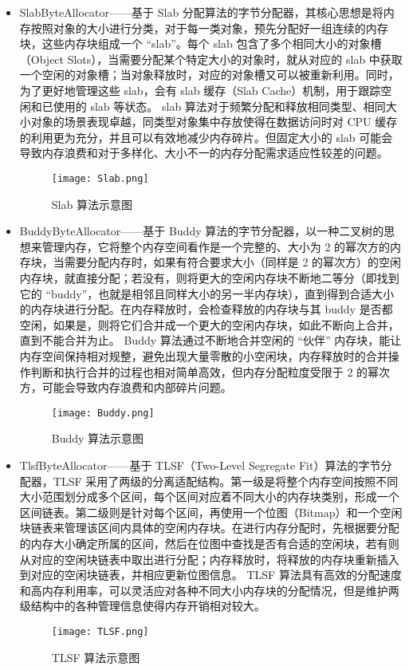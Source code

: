 \begin{itemize}
\item SlabByteAllocator——基于 Slab 分配算法的字节分配器，其核心思想是将内存按照对象的大小进行分类，对于每一类对象，预先分配好一组连续的内存块，这些内存块组成一个 “slab”。每个 slab 包含了多个相同大小的对象槽（Object Slots），当需要分配某个特定大小的对象时，就从对应的 slab 中获取一个空闲的对象槽；当对象释放时，对应的对象槽又可以被重新利用。同时，为了更好地管理这些 slab，会有 slab 缓存（Slab Cache）机制，用于跟踪空闲和已使用的 slab 等状态。
slab 算法对于频繁分配和释放相同类型、相同大小对象的场景表现卓越，同类型对象集中存放使得在数据访问时对 CPU 缓存的利用更为充分，并且可以有效地减少内存碎片。但固定大小的 slab 可能会导致内存浪费和对于多样化、大小不一的内存分配需求适应性较差的问题\cite{guo2024slabefficienttransformerssimplified}。
\begin{figure}
  \centering
  \texttt{[image: Slab.png]}
  \caption{Slab 算法示意图}
  \label{fig:Slab}
\end{figure}
\item BuddyByteAllocator——基于 Buddy 算法的字节分配器，以一种二叉树的思想来管理内存，它将整个内存空间看作是一个完整的、大小为 2 的幂次方的内存块，当需要分配内存时，如果有符合要求大小（同样是 2 的幂次方）的空闲内存块，就直接分配；若没有，则将更大的空闲内存块不断地二等分（即找到它的 “buddy”，也就是相邻且同样大小的另一半内存块），直到得到合适大小的内存块进行分配。在内存释放时，会检查释放的内存块与其 buddy 是否都空闲，如果是，则将它们合并成一个更大的空闲内存块，如此不断向上合并，直到不能合并为止。
Buddy 算法通过不断地合并空闲的 “伙伴” 内存块，能让内存空间保持相对规整，避免出现大量零散的小空闲块，内存释放时的合并操作判断和执行合并的过程也相对简单高效，但内存分配粒度受限于 2 的幂次方，可能会导致内存浪费和内部碎片问题。\cite{1020112250.nh}
\begin{figure}[H]
  \centering
  \texttt{[image: Buddy.png]}
  \caption{Buddy 算法示意图}
  \label{fig:Buddy}
\end{figure}
\item TlsfByteAllocator——基于 TLSF（Two-Level Segregate Fit）算法的字节分配器，TLSF 采用了两级的分离适配结构。第一级是将整个内存空间按照不同大小范围划分成多个区间，每个区间对应着不同大小的内存块类别，形成一个区间链表。第二级则是针对每个区间，再使用一个位图（Bitmap）和一个空闲块链表来管理该区间内具体的空闲内存块。在进行内存分配时，先根据要分配的内存大小确定所属的区间，然后在位图中查找是否有合适的空闲块，若有则从对应的空闲块链表中取出进行分配；内存释放时，将释放的内存块重新插入到对应的空闲块链表，并相应更新位图信息。
TLSF 算法具有高效的分配速度和高内存利用率，可以灵活应对各种不同大小内存块的分配情况，但是维护两级结构中的各种管理信息使得内存开销相对较大\cite{1311009}。
\begin{figure}[H]
  \centering
  \texttt{[image: TLSF.png]}
  \caption{TLSF 算法示意图}
  \label{fig:TLSF}
\end{figure}
\end{itemize}

